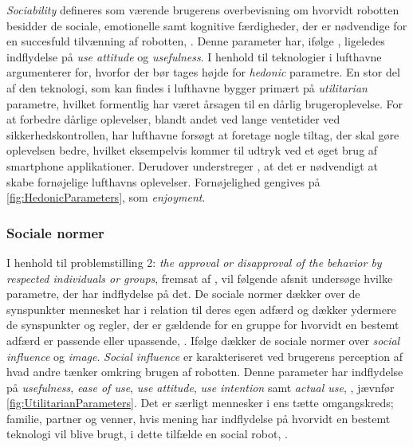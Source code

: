 \textit{Sociability} defineres som værende brugerens overbevisning om hvorvidt robotten besidder de sociale, emotionelle samt kognitive færdigheder, der er nødvendige for en succesfuld tilvænning af robotten, \parencite[s. 1478]{PDF:ExploringInfluencingVariable}. Denne parameter har, ifølge \textcite[s. 1478]{PDF:ExploringInfluencingVariable}, ligeledes indflydelse på \textit{use attitude} og \textit{usefulness}.\blankline
%
I henhold til teknologier i lufthavne argumenterer \textcite[s. 352]{PDF:TheImpactOfTraveler} for, hvorfor der bør tages højde for \textit{hedonic} parametre. En stor del af den teknologi, som kan findes i lufthavne bygger primært på \textit{utilitarian} parametre, hvilket formentlig har været årsagen til en dårlig brugeroplevelse. For at forbedre dårlige oplevelser, blandt andet ved lange ventetider ved sikkerhedskontrollen, har lufthavne forsøgt at foretage nogle tiltag, der skal gøre oplevelsen bedre, hvilket eksempelvis kommer til udtryk ved et øget brug af smartphone applikationer. Derudover understreger \textcite[s. 352]{PDF:TheImpactOfTraveler}, at det er nødvendigt at skabe fornøjelige lufthavns oplevelser. Fornøjelighed gengives på \autoref{fig:HedonicParameters}, som \textit{enjoyment}.
%

\subsubsection*{Sociale normer}
\label{InteraktionSocialeRobotterParametreSocialeNormer}
% 
I henhold til problemstilling 2: \textit{the approval or disapproval of the behavior by respected individuals or groups}, fremsat af \textcite[s. 1477]{PDF:SharingALifeHarvey}, vil følgende afsnit undersøge hvilke parametre, der har indflydelse på det.\blankline
%
De sociale normer dækker over de synspunkter mennesket har i relation til deres egen adfærd og dækker ydermere de synspunkter og regler, der er gældende for en gruppe for hvorvidt en bestemt adfærd er passende eller upassende, \parencite[s. 1478]{PDF:ExploringInfluencingVariable}. Ifølge \textcite[s. 1478]{PDF:ExploringInfluencingVariable} dækker de sociale normer over \textit{social influence} og \textit{image}. \textit{Social influence} er karakteriseret ved brugerens perception af hvad andre tænker omkring brugen af robotten. Denne parameter har indflydelse på \textit{usefulness}, \textit{ease of use}, \textit{use attitude}, \textit{use intention} samt \textit{actual use}, \parencite[s. 1478]{PDF:ExploringInfluencingVariable}, jævnfør \autoref{fig:UtilitarianParameters}. Det er særligt mennesker i ens tætte omgangskreds; familie, partner og venner, hvis mening har indflydelse på hvorvidt en bestemt teknologi vil blive brugt, i dette tilfælde en social robot, \parencite[s. 1478]{PDF:ExploringInfluencingVariable}. 

